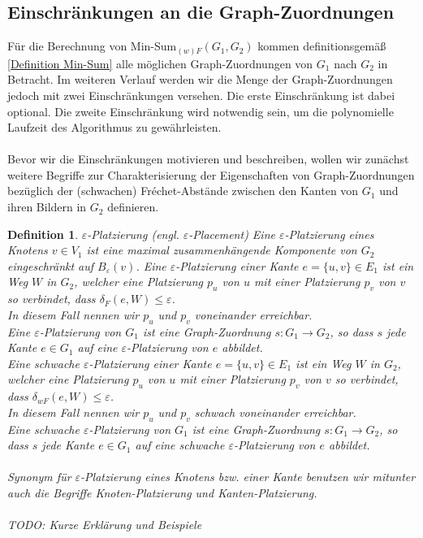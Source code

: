 \documentclass[a4paper, 12pt, twoside]{article}
\theoremstyle{Format1} %
\newtheorem{Def}{Definition}[section]       %
\begin{document}
\subsection{Einschränkungen an die Graph-Zuordnungen} \label{Einschränkungen}
Für die Berechnung von Min-Sum$_{(w)F}(G_1, G_2)$ kommen definitionsgemäß \ref{Definition Min-Sum} alle möglichen Graph-Zuordnungen von $G_1$ nach $G_2$ in Betracht.
Im weiteren Verlauf werden wir die Menge der Graph-Zuordnungen jedoch mit zwei Einschränkungen versehen.
Die erste Einschränkung ist dabei optional. Die zweite Einschränkung wird notwendig sein, um die polynomielle Laufzeit des Algorithmus zu gewährleisten.
\\
\\
Bevor wir die Einschränkungen motivieren und beschreiben, wollen wir zunächst weitere Begriffe zur Charakterisierung der Eigenschaften von Graph-Zuordnungen bezüglich
der (schwachen) Fréchet-Abstände zwischen den Kanten von $G_1$ und ihren Bildern in $G_2$ definieren.

\begin{Def}
	$\varepsilon$-Platzierung (engl. $\varepsilon$-Placement)
	Eine \textit{$\varepsilon$-Platzierung eines Knotens $v \in V_1$} ist eine maximal zusammenhängende Komponente von $G_2$ eingeschränkt auf $B_{\varepsilon}(v)$.
	Eine \textit{$\varepsilon$-Platzierung einer Kante $e = \{u,v\} \in E_1$} ist ein Weg $W$ in $G_2$, welcher eine Platzierung $p_u$ von $u$ mit einer Platzierung $p_v$ von $v$
	so verbindet, dass $\delta_F(e, W) \leq \varepsilon$.
	\\
	In diesem Fall nennen wir $p_u$ und $p_v$ \textit{voneinander erreichbar}.
	\\
	Eine \textit{$\varepsilon$-Platzierung von $G_1$} ist eine Graph-Zuordnung $s: G_1 \to G_2$, so dass $s$ jede Kante $e \in G_1$ auf eine $\varepsilon$-Platzierung von $e$ abbildet.
	\\
	Eine schwache $\varepsilon$-Platzierung einer Kante $e = \{u,v\} \in E_1$ ist ein Weg $W$ in $G_2$, welcher eine Platzierung $p_u$ von $u$ mit einer Platzierung $p_v$ von $v$
	so verbindet, dass $\delta_{wF}(e, W) \leq \varepsilon$.
	\\
	In diesem Fall nennen wir $p_u$ und $p_v$ \textit{schwach voneinander erreichbar}.
	\\
	Eine schwache \textit{$\varepsilon$-Platzierung von $G_1$} ist eine Graph-Zuordnung $s: G_1 \to G_2$, so dass $s$ jede Kante $e \in G_1$ auf eine schwache $\varepsilon$-Platzierung von $e$ abbildet.
	\\
	\\
	Synonym für $\varepsilon$-Platzierung eines Knotens bzw. einer Kante benutzen wir mitunter auch die Begriffe \textit{Knoten-Platzierung} und \textit{Kanten-Platzierung}.
	\\
	\\
	TODO: Kurze Erklärung und Beispiele
\end{Def}
\end{document}
